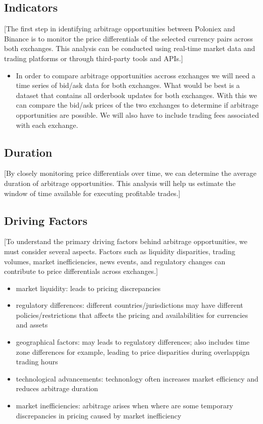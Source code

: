 \documentclass{article}
\begin{document}
\subsection{Indicators}
[The first step in identifying arbitrage opportunities between Poloniex and Binance is to monitor the price differentials of the selected currency pairs across both exchanges. This analysis can be conducted using real-time market data and trading platforms or through third-party tools and APIs.]
\begin{itemize}
  \item In order to compare arbitrage opportunities accross exchanges we will need a time series of bid/ask data for both exchanges. What would be best is a dataset that contains all orderbook updates for both exchanges. With this we can compare the bid/ask prices of the two exchanges to determine if arbitrage opportunities are possible. We will also have to include trading fees associated with each exchange.
\end{itemize}
\subsection{Duration}
[By closely monitoring price differentials over time, we can determine the average duration of arbitrage
opportunities. This analysis will help us estimate the window of time available for executing profitable
trades.]
\subsection{Driving Factors}
[To understand the primary driving factors behind arbitrage opportunities, we must consider several aspects. Factors such as liquidity disparities, trading volumes, market inefficiencies, news events, and regulatory changes can contribute to price differentials across exchanges.]
\begin{itemize}
  \item market liquidity: leads to pricing discrepancies
  \item regulatory differences: different countries/jurisdictions may have different policies/restrictions that affects the pricing and availabilities for currencies and assets
  \item geographical factors: may leads to regulatory differences; also includes time zone differences for example, leading to price disparities during overlappign trading hours
  \item technological advancements: technonlogy often increases market efficiency and reduces arbitrage duration
  \item market inefficiencies: arbitrage arises when where are some temporary discrepancies in pricing caused by market inefficiency
\end{itemize}
\end{document}
